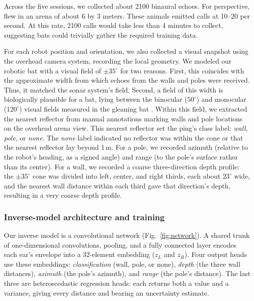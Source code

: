 \documentclass[11pt]{article}
\begin{document}
Across the five sessions, we collected about 2100 binaural echoes. For perspective, \citet{Barchi2013} flew  in an arena of about 6 by 3 meters. These animals emitted calls at 10--20 per second. At this rate, 2100 calls would take less than 4 minutes to collect, suggesting bats could trivially gather the required training data.

For each robot position and orientation, we also collected a visual snapshot using the overhead camera system, recording the local geometry. We modeled our robotic bat with a visual field of $\pm35^{\circ}$ for two reasons. First, this coincides with the approximate width from which echoes from the walls and poles were received. Thus, it matched the sonar system's field. Second, a field of this width is biologically plausible for a bat, lying between the binocular ($50^{\circ}$) and monocular ($120^{\circ}$) visual fields measured in the gleaning bat  \citep{Bell1986}. Within this field, we extracted the nearest reflector from manual annotations marking walls and pole locations on the overhead arena view. This nearest reflector set the ping's class label: \emph{wall}, \emph{pole}, or \emph{none}. The \emph{none} label indicated no reflector was within the cone or that the nearest reflector lay beyond 1\,m. For a pole, we recorded azimuth (relative to the robot's heading, as a signed angle) and range (to the pole's surface rather than its center). For a wall, we recorded a coarse three-direction depth profile: the $\pm 35^{\circ}$ cone was divided into left, center, and right thirds, each about $23^{\circ}$ wide, and the nearest wall distance within each third gave that direction's depth, resulting in a very coarse depth profile.

\subsubsection{Inverse-model architecture and training}

Our inverse model is a convolutional network (Fig.~\ref{fig:network}). A shared trunk of one-dimensional convolutions, pooling, and a fully connected layer encodes each ear's envelope into a 32-element embedding ($z_L$ and $z_R$). Four output heads use these embeddings: \emph{classification} (wall, pole, or none), \emph{depth} (the three wall distances), \emph{azimuth} (the pole's azimuth), and \emph{range} (the pole's distance). The last three are heteroscedastic regression heads: each returns both a value and a variance, giving every distance and bearing an uncertainty estimate.
\end{document}
